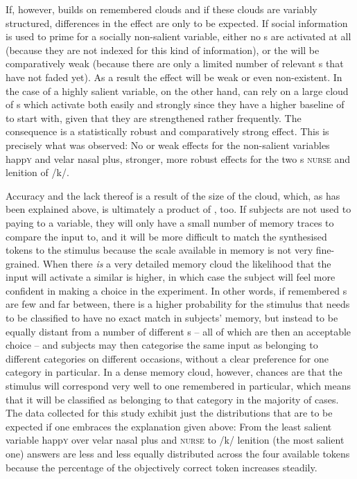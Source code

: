 If, however,  builds on remembered  clouds and if these clouds are variably structured, differences in the  effect are only to be expected.
If social information is used to prime for a socially non-salient variable, either no s are activated at all (because they are not indexed for this kind of information), or the  will be comparatively weak (because there are only a limited number of relevant s that have not faded yet).
As a result the  effect will be weak or even non-existent.
In the case of a highly salient variable, on the other hand,  can rely on a large cloud of s which activate both easily and strongly since they have a higher baseline of  to start with, given that they are strengthened rather frequently.
The consequence is a statistically robust and comparatively strong  effect.
This is precisely what was observed: No or weak  effects for the non-salient variables happ\textsc{y} and velar nasal plus, stronger, more robust  effects for the two s \textsc{nurse} and lenition of /k/.

Accuracy and the lack thereof is a result of the size of the  cloud, which, as has been explained above, is ultimately a product of , too.
If subjects are not used to paying  to a variable, they will only have a small number of memory traces to compare the input to, and it will be more difficult to match the synthesised tokens to the stimulus because the scale available in memory is not very fine-grained.
When there \emph{is} a very detailed memory cloud the likelihood that the input will activate a similar  is higher, in which case the subject will feel more confident in making a choice in the experiment.
In other words, if remembered s are few and far between, there is a higher probability for the stimulus that needs to be classified to have no exact match in subjects' memory, but instead to be equally distant from a number of different s -- all of which are then an acceptable choice -- and subjects may then categorise the same input as belonging to different categories on different occasions, without a clear preference for one category in particular.
In a dense memory cloud, however, chances are that the stimulus will correspond very well to one remembered  in particular, which means that it will be classified as belonging to that category in the majority of cases.
The data collected for this study exhibit just the distributions that are to be expected if one embraces the explanation given above: From the least salient variable happ\textsc{y} over velar nasal plus and \textsc{nurse} to /k/ lenition (the most salient one) answers are less and less equally distributed across the four available tokens because the percentage of the objectively correct token increases steadily.

